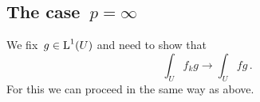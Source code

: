\subsection*{The case~$p = \infty$}

We fix~$g \in \operatorname{L}^1(U)$ and need to show that
\[
  \int_U f_k g
  \to
  \int_U f g \,.
\]
For this we can proceed in the same way as above.





% 
% 
% 




